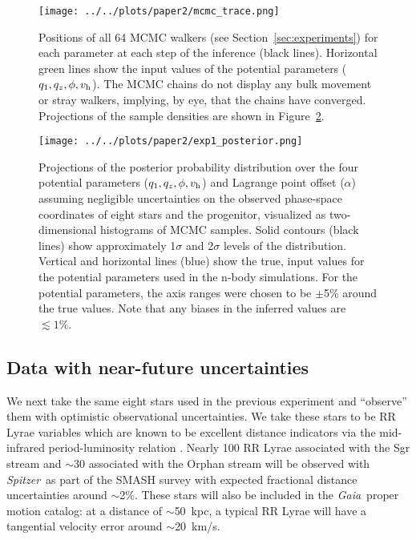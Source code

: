 \documentclass[letterpaper,12pt,preprint]{aastex}
\newcommand{\project}[1]{\textsl{#1}}
\newcommand{\gaia}{\project{Gaia}}
\newcommand{\spitzer}{\project{Spitzer}~}
\newcommand{\vhalo}{v_{\rm h}}
\newcommand{\potp}{$q_1,q_z,\phi,\vhalo$}
\begin{document}
\begin{figure}[!ht]
\begin{center}
\texttt{[image: ../../plots/paper2/mcmc\_trace.png]}
\caption{ Positions of all 64 MCMC walkers (see Section~\ref{sec:experiments}) for each parameter at each step of the inference (black lines). Horizontal green lines show the input values of the potential parameters (\potp). The MCMC chains do not display any bulk movement or stray walkers, implying, by eye, that the chains have converged. Projections of the sample densities are shown in Figure~\ref{fig:exp1_posterior}. }\label{fig:trace}
\end{center}
\end{figure}

\begin{figure}[!ht]
\begin{center}
\texttt{[image: ../../plots/paper2/exp1\_posterior.png]}
\caption{ Projections of the posterior probability distribution over the four potential parameters (\potp) and Lagrange point offset ($\alpha$) assuming negligible uncertainties on the observed phase-space coordinates of eight stars and the progenitor, visualized as two-dimensional histograms of MCMC samples. Solid contours (black lines) show approximately 1$\sigma$ and 2$\sigma$ levels of the distribution. Vertical and horizontal lines (blue) show the true, input values for the potential parameters used in the n-body simulations. For the potential parameters, the axis ranges were chosen to be $\pm$5\% around the true values. Note that any biases in the inferred values are $\lesssim1\%$. }\label{fig:exp1_posterior}
\end{center}
\end{figure}

\subsection{Data with near-future uncertainties}\label{sec:exp2}
We next take the same eight stars used in the previous experiment and ``observe'' them with optimistic observational uncertainties. We take these stars to be RR Lyrae variables which are known to be excellent distance indicators via the mid-infrared period-luminosity relation \citep[as shown in, e.g.,][]{madore12}. Nearly 100 RR Lyrae associated with the Sgr stream and $\sim$30 associated with the Orphan stream will be observed with \spitzer as part of the SMASH survey \citep{smashprop} with expected fractional distance uncertainties around $\sim$2\%. These stars will also be included in the \gaia\, proper motion catalog: at a distance of $\sim$50~kpc, a typical RR Lyrae will have a tangential velocity error around $\sim$20~km/s.
\end{document}
